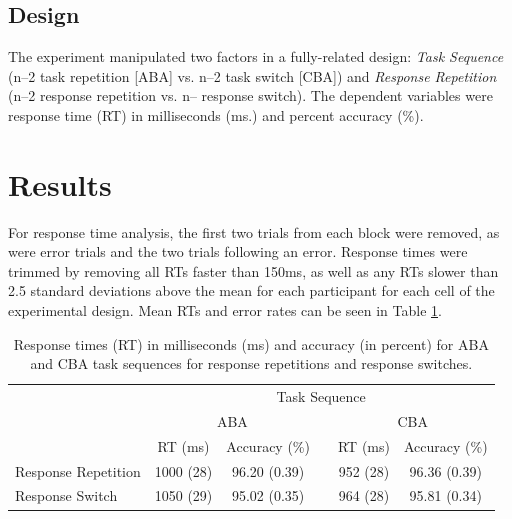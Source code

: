 \documentclass[a4paper, doc, natbib]{apa6}
\begin{document}
\subsection{Design}
The experiment manipulated two factors in a fully-related design: \emph{Task Sequence} (n--2 task repetition [ABA] vs. n--2 task switch [CBA]) and \emph{Response Repetition} (n--2 response repetition vs. n-- response switch). The dependent variables were response time (RT) in milliseconds (ms.) and percent accuracy (\%).


\section{Results}
For response time analysis, the first two trials from each block were removed, as were error trials and the two trials following an error. Response times were trimmed by removing all RTs faster than 150ms, as well as any RTs slower than 2.5 standard deviations above the mean for each participant for each cell of the experimental design. Mean RTs and error rates can be seen in Table \ref{tab:behaviouralData}.

\begin{table}[htbp]
\centering
\caption{Response times (RT) in milliseconds (ms) and accuracy (in percent) for ABA and CBA task sequences for response repetitions and response switches.}
\label{my-label}
\begin{tabular}{lccccc}
\hline
                    & \multicolumn{5}{c}{Task Sequence}                       \\ \cline{2-6} 
                    & \multicolumn{2}{c}{ABA}   &  & \multicolumn{2}{c}{CBA}  \\ \cline{2-3} \cline{5-6} 
                    & RT (ms)   & Accuracy (\%) &  & RT (ms)  & Accuracy (\%) \\ \hline
Response Repetition & 1000 (28) & 96.20 (0.39)  &  & 952 (28) & 96.36 (0.39) \\
Response Switch     & 1050 (29) & 95.02 (0.35)  &  & 964 (28) & 95.81 (0.34) \\ \hline
\end{tabular}
\label{tab:behaviouralData}
\end{table}
\end{document}
